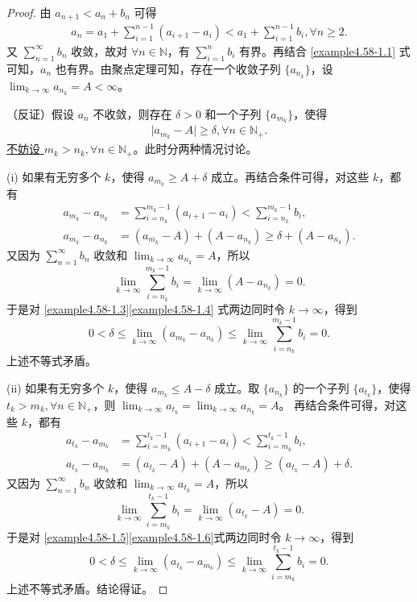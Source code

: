 \documentclass[../../main.tex]{subfiles}
\begin{document}
\begin{proof}
由 \(a_{n + 1} < a_n + b_n\) 可得
\begin{align}
a_n = a_1 + \sum_{i = 1}^{n - 1} (a_{i + 1} - a_i) < a_1 + \sum_{i = 1}^{n - 1} b_i, \forall n \geqslant 2. \label{example4.58-1.1}
\end{align}
又 \(\sum_{n = 1}^{\infty} b_n\) 收敛，故对 \(\forall n \in \mathbb{N}\)，有 \(\sum_{i = 1}^n b_i\) 有界。再结合 \eqref{example4.58-1.1} 式可知，\(a_n\) 也有界。由聚点定理可知，存在一个收敛子列 \(\{ a_{n_k} \}\)，设 \(\lim_{k \to \infty} a_{n_k} = A < \infty\)。

（反证）假设 \(a_n\) 不收敛，则存在 \(\delta > 0\) 和一个子列 \(\{ a_{m_k} \}\)，使得
\begin{align*}
\vert a_{m_k} - A \vert \geqslant \delta, \forall n \in \mathbb{N}_+. 
\end{align*}
\hyperlink{example4.58不妨设的原因}{不妨设 \(m_k > n_k, \forall n \in \mathbb{N}_+\)}。此时分两种情况讨论。

(i) 如果有无穷多个 \(k\)，使得 \(a_{m_k} \geqslant A + \delta\) 成立。再结合条件可得，对这些 \(k\)，都有
\begin{align}
a_{m_k} - a_{n_k} &= \sum_{i = n_k}^{m_k - 1} (a_{i + 1} - a_i) < \sum_{i = n_k}^{m_k - 1} b_i, \label{example4.58-1.3}\\
a_{m_k} - a_{n_k} &= (a_{m_k} - A) + (A - a_{n_k}) \geqslant \delta + (A - a_{n_k}). \label{example4.58-1.4}
\end{align}
又因为 \(\sum_{n = 1}^{\infty} b_n\) 收敛和 \(\lim_{k \to \infty} a_{n_k} = A\)，所以
\[
\lim_{k \to \infty} \sum_{i = n_k}^{m_k - 1} b_i = \lim_{k \to \infty} (A - a_{n_k}) = 0.
\]
于是对 \eqref{example4.58-1.3}\eqref{example4.58-1.4} 式两边同时令 \(k \to \infty\)，得到
\[
0 < \delta \leqslant \lim_{k \to \infty} (a_{m_k} - a_{n_k}) \leqslant \lim_{k \to \infty} \sum_{i = n_k}^{m_k - 1} b_i = 0.
\]
上述不等式矛盾。

(ii) 如果有无穷多个 \(k\)，使得 \(a_{m_k} \leqslant A - \delta\) 成立。取 \(\{ a_{n_k} \}\) 的一个子列 \(\{ a_{t_k} \}\)，使得 \(t_k > m_k, \forall n \in \mathbb{N}_+\)，则 \(\lim_{k \to \infty} a_{t_k} = \lim_{k \to \infty} a_{n_k} = A\)。
再结合条件可得，对这些 \(k\)，都有
\begin{align}
a_{t_k} - a_{m_k} &= \sum_{i = m_k}^{t_k - 1} (a_{i + 1} - a_i) < \sum_{i = m_k}^{t_k - 1} b_i, \label{example4.58-1.5}\\
a_{t_k} - a_{m_k} &= (a_{t_k} - A) + (A - a_{m_k}) \geqslant (a_{t_k} - A) + \delta. \label{example4.58-1.6}
\end{align}
又因为 \(\sum_{n = 1}^{\infty} b_n\) 收敛和 \(\lim_{k \to \infty} a_{t_k} = A\)，所以
\[
\lim_{k \to \infty} \sum_{i = m_k}^{t_k - 1} b_i = \lim_{k \to \infty} (a_{t_k} - A) = 0.
\]
于是对 \eqref{example4.58-1.5}\eqref{example4.58-1.6}式两边同时令 \(k \to \infty\)，得到
\[
0 < \delta \leqslant \lim_{k \to \infty} (a_{t_k} - a_{m_k}) \leqslant \lim_{k \to \infty} \sum_{i = m_k}^{t_k - 1} b_i = 0.
\]
上述不等式矛盾。结论得证。
\end{proof}
\end{document}
